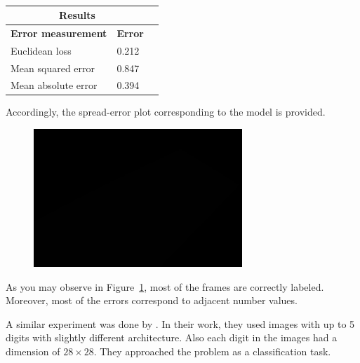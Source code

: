\begin{table}[H]
\centering
\small\sffamily
\begin{tabular}{llr}
\multicolumn{2}{c}{\textbf{\textbf{Results}}} \\
\bottomrule
\textbf{Error measurement}        & \textbf{Error} \\
\bottomrule
Euclidean loss           & 0.212  \\
Mean squared error       & 0.847  \\
Mean absolute error      & 0.394 \\
\bottomrule
\end{tabular}
\caption{}
\label{tab:res}
\end{table} 

Accordingly, the spread-error plot corresponding to the model is provided.

\begin{figure}[H]
	\centering
	{\includegraphics[width=0.7\textwidth]{images/1}}
	\caption{}
	\label{fig:splot}
\end{figure}

As you may observe in Figure~\ref{fig:splot}, most
of the frames are correctly labeled. Moreover, most of the errors correspond to adjacent number values.

\noindent A similar experiment was done by \citeauthor*{segui2015learning}. In their work, they used images with up to 5 digits with slightly different architecture. Also each digit in the images had a dimension of $28\times28$. They approached the problem as a classification task. 

